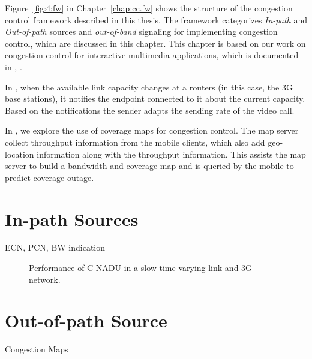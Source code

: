 Figure~\ref{fig:4:fw} in Chapter~\ref{chap:cc.fw} shows the structure of the
congestion control framework described in this thesis. The framework
categorizes \emph{In-path} and \emph{Out-of-path} sources and
\emph{out-of-band} signaling for implementing congestion control, which are
discussed in this chapter. This chapter is based on our work on congestion
control for interactive multimedia applications, which is documented in
, .

In , when the available link capacity changes at a routers (in
this case, the 3G base stations), it notifies the endpoint connected to it
about the current capacity. Based on the notifications the sender adapts the
sending rate of the video call.

In , we explore the use of coverage maps for congestion
control. The map server collect throughput information from the mobile
clients, which also add geo-location information along with the throughput
information. This assists the map server to build a bandwidth and coverage map
and is queried by the mobile to predict coverage outage.

\section{In-path Sources}

ECN, PCN, BW indication


\begin{figure}
  \centerline{
  }
  \caption{Performance of C-NADU in a slow time-varying link and 3G network.}
  \label{fig:cnadu}
\end{figure}

\section{Out-of-path Source}

Congestion Maps